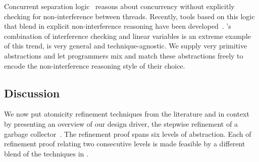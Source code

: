 Concurrent separation logic~\cite{OHearn07} reasons about concurrency without 
explicitly checking for non-interference between threads. 
Recently, tools based on this logic that blend in explicit non-interference reasoning have been developed~\cite{SAGL,RGSep}. 
\civl's combination of interference checking and linear variables is
an extreme example of this trend, is very general and technique-agnostic. 
We supply very primitive abstractions and let programmers mix and
match these abstractions freely to encode the non-interference reasoning style of their choice. 


\subsection{Discussion}
We now put atomicity refinement techniques from the literature and
\civl in context by presenting an overview of our design
driver, the stepwise refinement of a garbage collector~\cite{gc-techreport}.
The refinement proof spans six levels of abstraction. 
Each of refinement proof relating two consecutive levels is made feasible by a different
blend of the techniques in \civl. 

